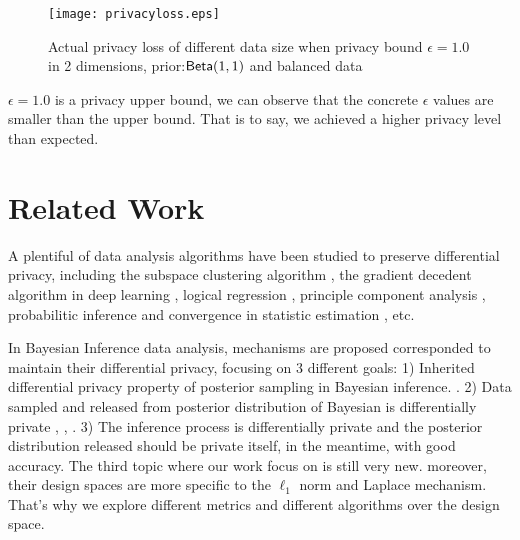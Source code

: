 \documentclass{article}
\begin{document}
\begin{figure}
\begin{center}
\centering
    \texttt{[image: privacyloss.eps]}
\caption{Actual privacy loss of different data size when privacy bound $\epsilon = 1.0$ in 2 dimensions, prior:$\mathsf{Beta}(1,1)$ and balanced data}
\label{fig_privacy}
\end{center}
\end{figure}

$\epsilon = 1.0$ is a privacy upper bound, we can observe that the concrete $\epsilon$ values are smaller than the upper bound. That is to say, we achieved a higher privacy level than expected. 



\section{Related Work}

A plentiful of data analysis algorithms have been studied to preserve differential privacy, including the subspace clustering algorithm \cite{wang2015differentially}, the gradient decedent algorithm in deep learning \cite{abadi2016deep}, logical regression \cite{chaudhuri2009privacy}, principle component analysis \cite{chaudhuri2012near}, probabilitic inference \cite{williams2010probabilistic} and convergence in statistic estimation \cite{chaudhuri2012convergence}, etc. 

In Bayesian Inference data analysis, mechanisms are proposed corresponded to maintain their differential privacy, focusing on 3 different goals: 1) Inherited differential privacy property of posterior sampling in Bayesian inference. \cite{dimitrakakis2014robust,zhang2016differential,zheng2015differential,wang2015privacy}. 2) Data sampled and released from posterior distribution of Bayesian is differentially private \cite{Zhang2017privbayes}, \cite{dimitrakakis2015differential},  \cite{foulds2016theory}. 3) The inference process is differentially private and the posterior distribution released should be private itself, in the meantime, with good accuracy. The third topic where our work focus on is still very new. moreover, their design spaces are more specific to the $\ell_1$ norm and Laplace mechanism. That's why we explore different metrics and different algorithms over the design space.
\end{document}
